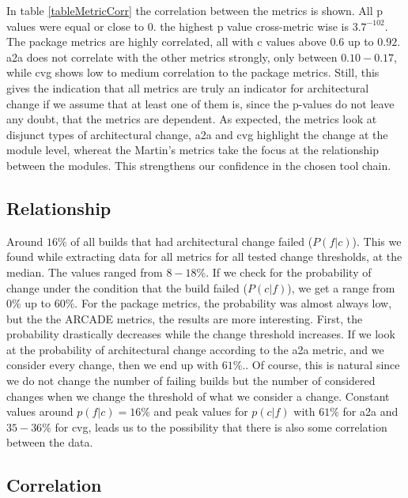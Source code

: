 \documentclass[sigplan, anonymous, review]{acmart}
\begin{document}
In table \ref{tableMetricCorr} the correlation between the metrics is shown. All p values were equal or close to 0. the highest p value cross-metric wise is $3.7^{-102}$. 
The package metrics are highly correlated, all with c values above $0.6$ up to $0.92$. a2a does not correlate with the other metrics strongly, only between $0.10-0.17$, while cvg shows low to medium correlation to the package metrics. 
Still, this gives the indication that all metrics are truly an indicator for architectural change if we assume that at least one of them is, since the p-values do not leave any doubt, that the metrics are dependent.
As expected, the metrics look at disjunct types of architectural change, a2a and cvg highlight the change at the module level, whereat the Martin's metrics take the focus at the relationship between the modules. This strengthens our confidence in the chosen tool chain. 


\subsection{Relationship}

Around $16\%$ of all builds that had architectural change failed ($P(f|c)$). This we found while extracting data for all metrics for all tested change thresholds, at the median. The values ranged from $8-18\%$. 
If we check for the probability of change under the condition that the build failed ($P(c|f)$), we get a range from $0\%$ up to $60\%$. For the package metrics, the probability was almost always low, but the the ARCADE metrics, the results are more interesting. First, the probability drastically decreases while the change threshold increases. If we look at the probability of architectural change according to the a2a metric, and we consider every change, then we end up with $61\%$.. Of course, this is natural since we do not change the number of failing builds but the number of considered changes when we change the threshold of what we consider a change. 
Constant values around $p(f|c) = 16\%$ and peak values for $p(c|f)$ with $61\%$ for a2a and $35-36\%$ for cvg, leads us to the possibility that there is also some correlation between the data.

\subsection{Correlation}

\end{document}
